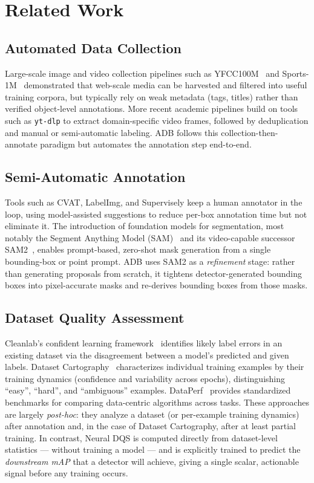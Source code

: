 \documentclass[11pt]{article}
\begin{document}
\section{Related Work}
\label{sec:related}

\subsection{Automated Data Collection}

Large-scale image and video collection pipelines such as
YFCC100M~\citep{thomee2016yfcc100m} and Sports-1M~\citep{karpathy2014large}
demonstrated that web-scale media can be harvested and filtered into useful
training corpora, but typically rely on weak metadata (tags, titles) rather
than verified object-level annotations. More recent academic pipelines build
on tools such as \texttt{yt-dlp} to extract domain-specific video frames,
followed by deduplication and manual or semi-automatic labeling. ADB follows
this collection-then-annotate paradigm but automates the annotation step
end-to-end.

\subsection{Semi-Automatic Annotation}

Tools such as CVAT, LabelImg, and Supervisely keep a human annotator in the
loop, using model-assisted suggestions to reduce per-box annotation time but
not eliminate it. The introduction of foundation models for segmentation,
most notably the Segment Anything Model
(SAM)~\citep{kirillov2023segment} and its video-capable successor
SAM2~\citep{ravi2024sam2}, enables prompt-based, zero-shot mask generation
from a single bounding-box or point prompt. ADB uses SAM2 as a
\emph{refinement} stage: rather than generating proposals from scratch, it
tightens detector-generated bounding boxes into pixel-accurate masks and
re-derives bounding boxes from those masks.

\subsection{Dataset Quality Assessment}

Cleanlab's confident learning framework~\citep{northcutt2021confident}
identifies likely label errors in an existing dataset via the disagreement
between a model's predicted and given labels. Dataset
Cartography~\citep{swayamdipta2020dataset} characterizes individual training
examples by their training dynamics (confidence and variability across
epochs), distinguishing ``easy'', ``hard'', and ``ambiguous'' examples.
DataPerf~\citep{mazumder2022dataperf} provides standardized benchmarks for
comparing data-centric algorithms across tasks. These approaches are largely
\emph{post-hoc}: they analyze a dataset (or per-example training dynamics)
after annotation and, in the case of Dataset Cartography, after at least
partial training. In contrast, Neural DQS is computed directly from
dataset-level statistics --- without training a model --- and is explicitly
trained to predict the \emph{downstream mAP} that a detector will achieve,
giving a single scalar, actionable signal before any training occurs.
\end{document}
